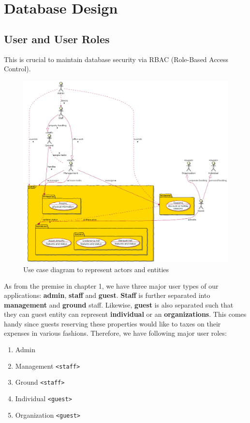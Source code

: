 \chapter{Database Design}

\section[User Roles]{User and User Roles}

This is crucial to maintain database security via RBAC (Role-Based Access Control).

\begin{figure}[h]
	\centerline
	{\includegraphics[width=15cm]{fig/HotelUseCase}}
	\caption{Use case diagram to represent actors and entities}
\end{figure}

As from the premise in chapter 1, we have three major user types of our applications: \textbf{admin}, \textbf{staff} and \textbf{guest}. \textbf{Staff} is further separated into \textbf{management} and \textbf{ground} staff. Likewise, \textbf{guest} is also separated such that they can guest entity can represent \textbf{individual} or an \textbf{organizations}. This comes handy since guests reserving these properties would like to taxes on their expenses in various fashions. Therefore, we have following major user roles:

\begin{enumerate}
	\item Admin
	\item Management \texttt{<staff>}
	\item Ground \texttt{<staff>}
	\item Individual \texttt{<guest>}
	\item Organization \texttt{<guest>}
\end{enumerate}

